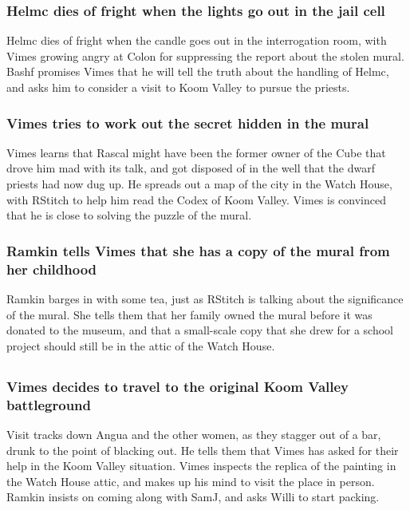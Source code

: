 \subsubsection{\Gls{Helmc} dies of fright when the lights go out in the jail cell}
\Gls{Helmc} dies of fright when the candle goes out in the interrogation room, with \Gls{Vimes}
growing angry at \Gls{Colon} for suppressing the report about the stolen mural. \Gls{Bashf} promises
\Gls{Vimes} that he will tell the truth about the handling of \Gls{Helmc}, and asks him to consider
a visit to Koom Valley to pursue the priests.

\subsubsection{\Gls{Vimes} tries to work out the secret hidden in the mural}
\Gls{Vimes} learns that \Gls{Rascal} might have been the former owner of the Cube that drove him mad
with its talk, and got disposed of in the well that the dwarf priests had now dug up. He spreads out
a map of the city in the Watch House, with \Gls{RStitch} to help him read the Codex of Koom Valley.
\Gls{Vimes} is convinced that he is close to solving the puzzle of the mural.

\subsubsection{\Gls{Ramkin} tells \Gls{Vimes} that she has a copy of the mural from her childhood}
\Gls{Ramkin} barges in with some tea, just as \Gls{RStitch} is talking about the significance of
the mural. She tells them that her family owned the mural before it was donated to the museum, and
that a small-scale copy that she drew for a school project should still be in the attic of the
Watch House.

\subsection{}
\subsubsection{\Gls{Vimes} decides to travel to the original Koom Valley battleground}
\Gls{Visit} tracks down \Gls{Angua} and the other women, as they stagger out of a bar, drunk to
the point of blacking out. He tells them that \Gls{Vimes} has asked for their help in the Koom
Valley situation. \Gls{Vimes} inspects the replica of the painting in the Watch House attic, and
makes up his mind to visit the place in person. \Gls{Ramkin} insists on coming along with
\Gls{SamJ}, and asks \Gls{Willi} to start packing.


